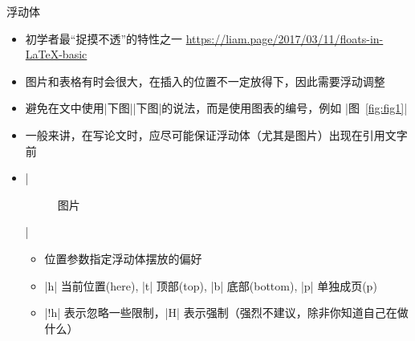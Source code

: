 \begin{frame}[fragile]{浮动体}
    \begin{itemize}
        \item 初学者最“捉摸不透”的特性之一 \url{https://liam.page/2017/03/11/floats-in-LaTeX-basic}
        \item 图片和表格有时会很大，在插入的位置不一定放得下，因此需要浮动调整
        \item 避免在文中使用|下图||下图|的说法，而是使用图表的编号，例如 |图~\ref{fig:fig1}|
        \item 一般来讲，在写论文时，应尽可能保证浮动体（尤其是图片）出现在引用文字前
        \item |\begin{figure}[<位置参数>] 图片 \end{figure}|
              \begin{itemize}
                  \item 位置参数指定浮动体摆放的偏好
                  \item |h| 当前位置(here), |t| 顶部(top), |b| 底部(bottom), |p| 单独成页(p)
                  \item |!h| 表示忽略一些限制，|H| 表示强制\alert{（强烈不建议，除非你知道自己在做什么）}
              \end{itemize}
    \end{itemize}
\end{frame}

